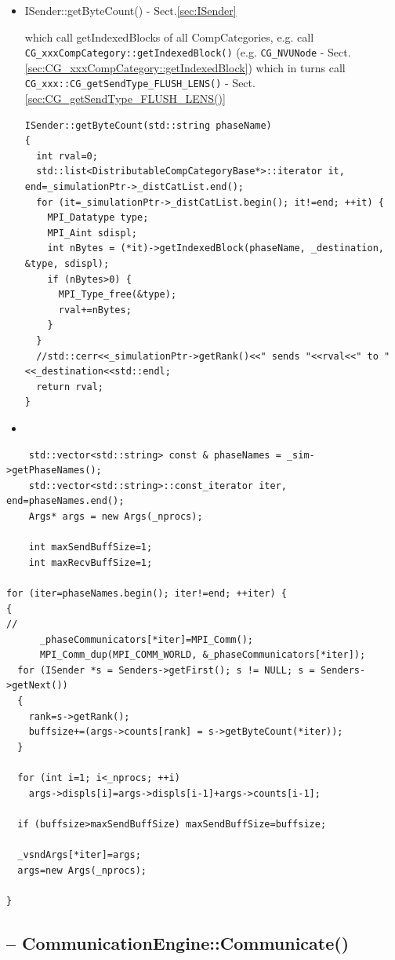 \begin{itemize}
  \item  ISender::getByteCount() - Sect.\ref{sec:ISender}

which call getIndexedBlocks of all CompCategories, e.g. call
\verb!CG_xxxCompCategory::getIndexedBlock()! (e.g.
\verb!CG_NVUNode! - Sect.\ref{sec:CG_xxxCompCategory::getIndexedBlock}) which in
turns call \verb!CG_xxx::CG_getSendType_FLUSH_LENS()! -
Sect.\ref{sec:CG_getSendType_FLUSH_LENS()}

\label{sec:ISender}
\label{sec:ISender::getByteCount()}
\begin{verbatim}
ISender::getByteCount(std::string phaseName)
{
  int rval=0;
  std::list<DistributableCompCategoryBase*>::iterator it, end=_simulationPtr->_distCatList.end();
  for (it=_simulationPtr->_distCatList.begin(); it!=end; ++it) {
    MPI_Datatype type;
    MPI_Aint sdispl;
    int nBytes = (*it)->getIndexedBlock(phaseName, _destination, &type, sdispl);
    if (nBytes>0) {
      MPI_Type_free(&type);
      rval+=nBytes;
    }
  }
  //std::cerr<<_simulationPtr->getRank()<<" sends "<<rval<<" to "<<_destination<<std::endl;
  return rval;
}
\end{verbatim}
  
  \item 
\end{itemize}
 
\begin{verbatim}
    std::vector<std::string> const & phaseNames = _sim->getPhaseNames();
    std::vector<std::string>::const_iterator iter, end=phaseNames.end();
    Args* args = new Args(_nprocs);

    int maxSendBuffSize=1;
    int maxRecvBuffSize=1;

for (iter=phaseNames.begin(); iter!=end; ++iter) {
{
//
      _phaseCommunicators[*iter]=MPI_Comm();
      MPI_Comm_dup(MPI_COMM_WORLD, &_phaseCommunicators[*iter]);
  for (ISender *s = Senders->getFirst(); s != NULL; s = Senders->getNext()) 
  {
  	rank=s->getRank();
	buffsize+=(args->counts[rank] = s->getByteCount(*iter));
  }
  
  for (int i=1; i<_nprocs; ++i)
	args->displs[i]=args->displs[i-1]+args->counts[i-1];
  
  if (buffsize>maxSendBuffSize) maxSendBuffSize=buffsize;
  
  _vsndArgs[*iter]=args; 	
  args=new Args(_nprocs);
  
}
\end{verbatim}


\subsection{-- CommunicationEngine::Communicate() }
\label{sec:CommunicationEngine.Communicate()}

